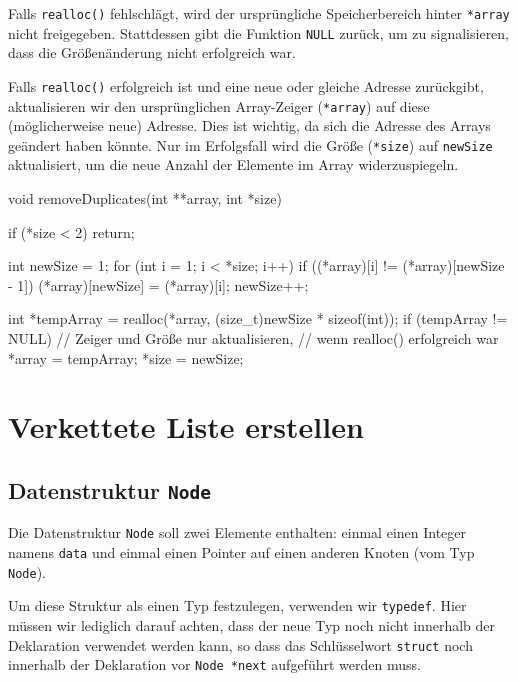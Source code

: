 Falls \texttt{realloc()} fehlschlägt, wird der ursprüngliche
Speicherbereich hinter \texttt{*array} nicht freigegeben. Stattdessen
gibt die Funktion \texttt{NULL} zurück, um zu signalisieren, dass die
Größenänderung nicht erfolgreich war.

Falls \texttt{realloc()} erfolgreich ist und eine neue oder gleiche
Adresse zurückgibt, aktualisieren wir den ursprünglichen Array-Zeiger
(\texttt{*array}) auf diese (möglicherweise neue) Adresse. Dies ist
wichtig, da sich die Adresse des Arrays geändert haben könnte. Nur im
Erfolgsfall wird die Größe (\texttt{*size}) auf \texttt{newSize}
aktualisiert, um die neue Anzahl der Elemente im Array widerzuspiegeln.

\begin{codebox}[lang=c, fontsize=\small]
void removeDuplicates(int **array, int *size) {
    if (*size < 2) {
        return;
    }

    int newSize = 1;
    for (int i = 1; i < *size; i++) {
        if ((*array)[i] != (*array)[newSize - 1]) {
            (*array)[newSize] = (*array)[i];
            newSize++;
        }
    }

    int *tempArray = realloc(*array, (size_t)newSize * sizeof(int));
    if (tempArray != NULL) {
        // Zeiger und Größe nur aktualisieren,
        // wenn realloc() erfolgreich war
        *array = tempArray;
        *size = newSize;
    }
}
\end{codebox}




\chapter{Verkettete Liste erstellen}

\section*{Datenstruktur \texttt{Node}}

Die Datenstruktur \texttt{Node} soll zwei Elemente enthalten: einmal
einen Integer namens \texttt{data} und einmal einen Pointer auf einen
anderen Knoten (vom Typ \texttt{Node}).

Um diese Struktur als einen Typ festzulegen, verwenden wir
\texttt{typedef}. Hier müssen wir lediglich darauf achten, dass der neue
Typ noch nicht innerhalb der Deklaration verwendet werden kann, so dass das
Schlüsselwort \texttt{struct} noch innerhalb der Deklaration vor
\texttt{Node *next} aufgeführt werden muss.

